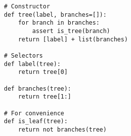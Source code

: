 \begin{lstlisting}
# Constructor
def tree(label, branches=[]):
    for branch in branches:
        assert is_tree(branch)
    return [label] + list(branches)

# Selectors
def label(tree):
    return tree[0]

def branches(tree):
    return tree[1:]

# For convenience
def is_leaf(tree):
    return not branches(tree)
\end{lstlisting}

